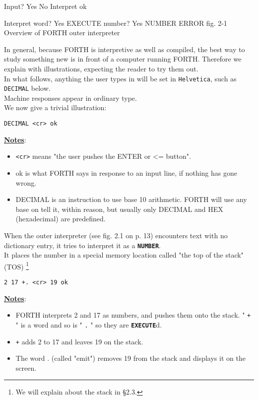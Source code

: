 Input? Yes
No Interpret
ok

Interpret
word? Yes EXECUTE
number? Yes NUMBER
ERROR
fig. 2-1 Overview of FORTH outer interpreter

In general, because FORTH is interpretive as well as compiled, the best way to study something new is in front of a computer running FORTH. Therefore we explain with illustrations, expecting the reader to try them out. \\

In what follows, anything the user types in will be set in \lstinline$Helvetica$, such as \lstinline$DECIMAL$ below. \\

Machine responses appear in ordinary type. \\ 

We now give a trivial illustration:

\begin{lstlisting}
DECIMAL <cr> ok
\end{lstlisting}

\underline{\textbf{Notes}}:
\begin{itemize}
  \item \lstinline$<cr>$ means "the user pushes the ENTER or <= button".
  \item ok is what FORTH says in response to an input line, if nothing has gone wrong.
  \item DECIMAL is an instruction to use base 10 arithmetic. FORTH will use any base on tell it, within reason, but usually only DECIMAL and HEX (hexadecimal) are predefined.
\end{itemize}

When the outer interpreter (see fig. 2.1 on p. 13) encounters text with no dictionary entry, it tries to interpret it as a \textbf{\lstinline$NUMBER$}. \\

It places the number in a special memory location called "the top of the stack" (TOS)  \footnote{We will explain about the stack in §2.3.}
\begin{lstlisting}
2 17 +. <cr> 19 ok
\end{lstlisting}

\underline{\textbf{Notes}}:
\begin{itemize}
  \item FORTH interprets 2 and 17 as numbers, and pushes them onto the stack. " \lstinline$+$ " is a word and so is " \lstinline$.$ " so they are \textbf{\lstinline$EXECUTE$}d.
  \item \lstinline$+$ adds 2 to 17 and leaves 19 on the stack.
  \item The word . (called "emit") removes 19 from the stack and displays it on the screen.
\end{itemize}

